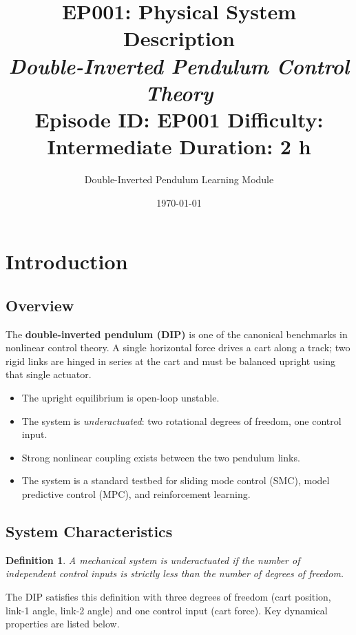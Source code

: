 \documentclass[11pt,a4paper]{article}
\title{\textbf{EP001: Physical System Description}\\[0.5em]
       \large\textit{Double-Inverted Pendulum Control Theory}\\[0.5em]
       \normalsize Episode ID: EP001 \quad Difficulty: Intermediate \quad Duration: 2 h}
\author{Double-Inverted Pendulum Learning Module}
\date{\today}
\newtheorem{definition}{Definition}[section]
\begin{document}

\maketitle
\tableofcontents
\newpage

\section{Introduction}

\subsection{Overview}

The \textbf{double-inverted pendulum (DIP)} is one of the canonical benchmarks
in nonlinear control theory.  A single horizontal force drives a cart along a
track; two rigid links are hinged in series at the cart and must be balanced
upright using that single actuator.

\begin{itemize}
    \item The upright equilibrium is open-loop unstable.
    \item The system is \emph{underactuated}: two rotational degrees of freedom,
          one control input.
    \item Strong nonlinear coupling exists between the two pendulum links.
    \item The system is a standard testbed for sliding mode control (SMC),
          model predictive control (MPC), and reinforcement learning.
\end{itemize}

\subsection{System Characteristics}

\begin{definition}
A mechanical system is \emph{underactuated} if the number of independent
control inputs is strictly less than the number of degrees of freedom.
\end{definition}

The DIP satisfies this definition with three degrees of freedom (cart position,
link-1 angle, link-2 angle) and one control input (cart force).  Key dynamical
properties are listed below.
\end{document}
